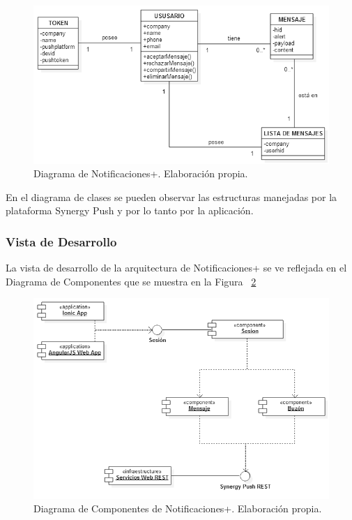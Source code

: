 \begin{figure}
  \centering
  \includegraphics[scale=0.4,type=png,ext=.png,read=.png,angle=0,origin=c]{imagenes/Diagrama_de_Clases}
  \caption{Diagrama de Notificaciones+. Elaboración propia.}
  \label{fig:clases}
\end{figure}


En el diagrama de clases se pueden observar las estructuras manejadas por la plataforma Synergy Push y por lo tanto por la aplicación.


\subsubsection{Vista de Desarrollo}
La vista de desarrollo de la arquitectura de Notificaciones+ se ve reflejada en el Diagrama de Componentes que se muestra en la Figura ~\ref{fig:componentes}


\begin{figure}
  \centering
  \includegraphics[scale=0.5,type=png,ext=.png,read=.png,angle=0,origin=c]{imagenes/Diagrama_de_Componentes}
  \caption{Diagrama de Componentes de Notificaciones+. Elaboración propia.}
  \label{fig:componentes}
\end{figure}


